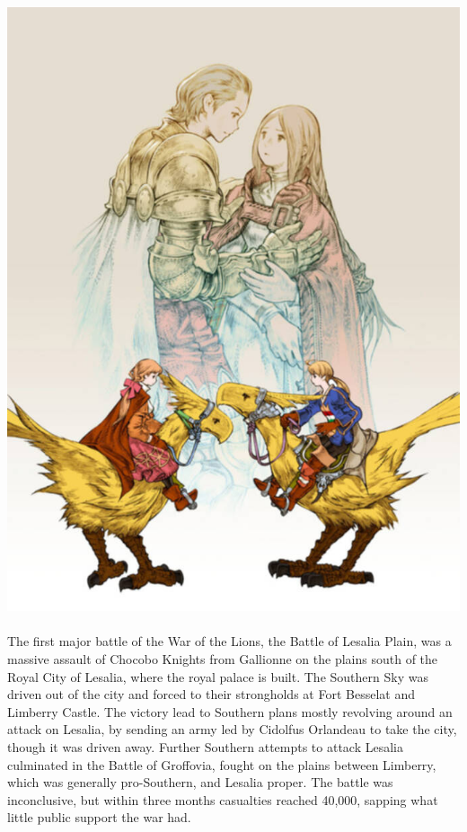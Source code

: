 %
\\\\
\includegraphics[width=\columnwidth]{./art/images/cover.jpg}
\\\\
%
The first major battle of the War of the Lions, the Battle of Lesalia Plain, was a massive assault of Chocobo Knights from Gallionne on the plains south of the Royal City of Lesalia, where the royal palace is built. 
The Southern Sky was driven out of the city and forced to their strongholds at Fort Besselat and Limberry Castle. 
The victory lead to Southern plans mostly revolving around an attack on Lesalia, by sending an army led by Cidolfus Orlandeau to take the city, though it was driven away.
Further Southern attempts to attack Lesalia culminated in the Battle of Groffovia, fought on the plains between Limberry, which was generally pro-Southern, and Lesalia proper. 
The battle was inconclusive, but within three months casualties reached 40,000, sapping what little public support the war had.
